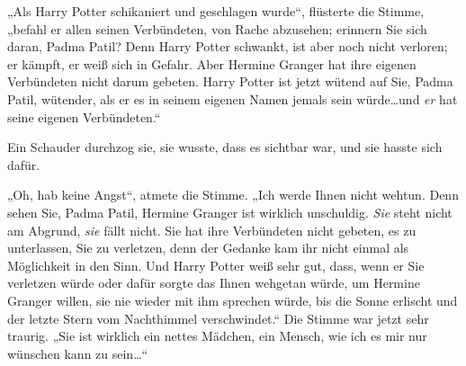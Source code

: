 „Als Harry Potter schikaniert und geschlagen wurde“, flüsterte die Stimme, „befahl er allen seinen Verbündeten, von Rache abzusehen; erinnern Sie sich daran, Padma Patil? Denn Harry Potter schwankt, ist aber noch nicht verloren; er kämpft, er weiß sich in Gefahr. Aber Hermine Granger hat ihre eigenen Verbündeten nicht darum gebeten. Harry Potter ist jetzt wütend auf Sie, Padma Patil, wütender, als er es in seinem eigenen Namen jemals sein würde…und \emph{er} hat seine eigenen Verbündeten.“

Ein Schauder durchzog sie, sie wusste, dass es sichtbar war, und sie hasste sich dafür.

„Oh, hab keine Angst“, atmete die Stimme. „Ich werde Ihnen nicht wehtun. Denn sehen Sie, Padma Patil, Hermine Granger ist wirklich unschuldig. \emph{Sie} steht nicht am Abgrund, \emph{sie} fällt nicht. Sie hat ihre Verbündeten nicht gebeten, es zu unterlassen, Sie zu verletzen, denn der Gedanke kam ihr nicht einmal als Möglichkeit in den Sinn. Und Harry Potter weiß sehr gut, dass, wenn er Sie verletzen würde oder dafür sorgte das Ihnen wehgetan würde, um Hermine Granger willen, sie nie wieder mit ihm sprechen würde, bis die Sonne erlischt und der letzte Stern vom Nachthimmel verschwindet.“ Die Stimme war jetzt sehr traurig. „Sie ist wirklich ein nettes Mädchen, ein Mensch, wie ich es mir nur wünschen kann zu sein…“

